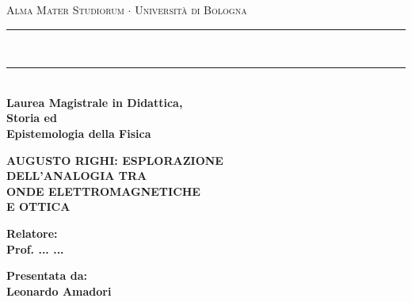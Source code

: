\documentclass[12pt,a4paper,twoside]{book}
\begin{document}
\setlength{\parindent}{0pt}
\setlength{\parskip}{0pt}

\begin{titlepage}
\begin{center}
{\Large\textsc{Alma Mater Studiorum $\cdot$ Universit\`a di Bologna}}\\[2mm]
\rule[0.1cm]{\textwidth}{0.1mm}\\
\rule[0.5cm]{\textwidth}{0.6mm}\\
{\small\bf Laurea Magistrale in Didattica,\\ Storia ed\\ Epistemologia della Fisica}
\end{center}

\vspace{15mm}

\begin{center}
{\LARGE\bf AUGUSTO RIGHI: ESPLORAZIONE}\\[3mm]
{\LARGE\bf DELL'ANALOGIA TRA}\\[3mm]
{\LARGE\bf ONDE ELETTROMAGNETICHE}\\[3mm]
{\LARGE\bf E OTTICA}
\end{center}

\vfill

\noindent
\begin{minipage}[t]{0.47\textwidth}
{\large\bf Relatore:\\
Prof. ... ...}
\end{minipage}
\hfill
\begin{minipage}[t]{0.47\textwidth}\raggedleft
{\large\bf Presentata da:\\
Leonardo Amadori}
\end{minipage}


\end{titlepage}
\end{document}
